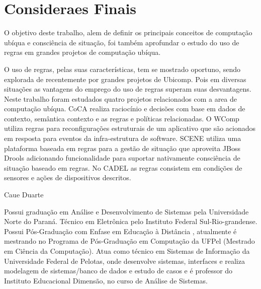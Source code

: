 \documentclass[12pt,a4paper,compsoc]{IEEEtran}
\begin{document}
\section{Consideraes Finais}

  O objetivo deste trabalho, alem de definir os principais conceitos de computação ubíqua e 
  consciência de situação, foi também aprofundar o estudo do uso de regras em grandes projetos de
  computação ubíqua.
  
  O uso de regras, pelas suas características, tem se mostrado oportuno, sendo explorada de 
  recentemente por grandes projetos de Ubicomp. Pois em diversas situações as vantagens do emprego
  do uso de regras superam suas desvantagens. Neste trabalho foram estudados quatro projetos
  relacionados com a area de computação ubíqua. CoCA realiza raciocínio e decisões com base em 
  dados de contexto, semântica contexto e as regras e políticas relacionadas. O WComp utiliza
  regras para reconfigurações estruturais de um aplicativo que são acionados em resposta para
  eventos da infra-estrutura de software. SCENE utiliza uma plataforma baseada em regras para a
  gestão de situação que aproveita JBoss Drools adicionando funcionalidade para suportar 
  nativamente consciência de situação baseado em regras. No CADEL as regras consistem em condições
  de sensores e ações de dispositivos descritos.






\begin{IEEEbiography}{Caue Duarte}

  Possui graduação em Análise e Desenvolvimento de Sistemas pela Universidade Norte do Paraná.
  Técnico em Eletrônica pelo Instituto Federal Sul-Rio-grandense. Possui Pós-Graduação com Enfase
  em Educação à Distância , atualmente é mestrando no Programa de Pós-Graduação em Computação da
  UFPel (Mestrado em Ciência da Computação). Atua como técnico em Sistemas de Informação da
  Universidade Federal de Pelotas, onde desenvolve sistemas, interfaces e realiza modelagem de
  sistemas/banco de dados e estudo de casos e é professor do Instituto Educacional Dimensão, no
  curso de Análise de Sistemas. 
\end{IEEEbiography}
\end{document}

